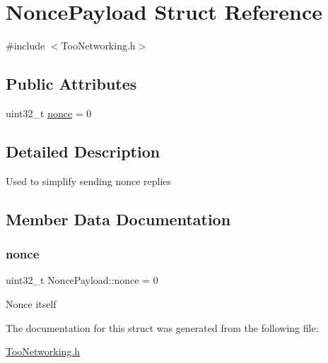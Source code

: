 \hypertarget{structNoncePayload}{}\section{Nonce\+Payload Struct Reference}
\label{structNoncePayload}


{\ttfamily \#include $<$Too\+Networking.\+h$>$}

\subsection*{Public Attributes}
\begin{DoxyCompactItemize}
\item 
uint32\+\_\+t \hyperlink{structNoncePayload_ac738ccf9734f52407eef0b48bdf6cb01}{nonce} = 0
\end{DoxyCompactItemize}


\subsection{Detailed Description}
Used to simplify sending nonce replies 

\subsection{Member Data Documentation}
\mbox{\label{structNoncePayload_ac738ccf9734f52407eef0b48bdf6cb01}} 
\subsubsection{\texorpdfstring{nonce}{nonce}}
{\footnotesize\ttfamily uint32\+\_\+t Nonce\+Payload\+::nonce = 0}

Nonce itself 

The documentation for this struct was generated from the following file\+:\begin{DoxyCompactItemize}
\item 
\hyperlink{TooNetworking_8h}{Too\+Networking.\+h}\end{DoxyCompactItemize}
